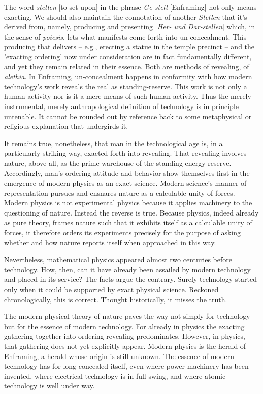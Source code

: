 \documentclass[12pt]{article}
\begin{document}
The word \textit{stellen} [to set upon] in the phrase \textit{Ge-stell} [Enframing] not only means exacting. We should also maintain the connotation of another \textit{Stellen} that it's derived from, namely, producing and presenting [\textit{Her- und Dar-stellen}] which, in the sense of \textit{poi{\-e}sis}, lets what manifests come forth into un-concealment. This producing that delivers -- e.g., erecting a statue in the temple precinct -- and the 'exacting ordering' now under consideration are in fact fundamentally different, and yet they remain related in their essence. Both are methods of revealing, of \textit{al{\-e}thia}. In Enframing, un-concealment happens in conformity with how modern technology's work reveals the real as standing-reserve. This work is not only a human activity nor is it a mere means of such human activity. Thus the merely instrumental, merely anthropological definition of technology is in principle untenable. It cannot be rounded out by reference back to some metaphysical or religious explanation that undergirds it.

It remains true, nonetheless, that man in the technological age is, in a particularly striking way, exacted forth into revealing. That revealing involves nature, above all, as the prime warehouse of the standing energy reserve. Accordingly, man's ordering attitude and behavior show themselves first in the emergence of modern physics as an exact science. Modern science's manner of representation pursues and ensnares nature as a calculable unity of forces. Modern physics is not experimental physics because it applies machinery to the questioning of nature. Instead the reverse is true. Because physics, indeed already as pure theory, frames nature such that it exhibits itself as a calculable unity of forces, it therefore orders its experiments precisely for the purpose of asking whether and how nature reports itself when approached in this way.

Nevertheless, mathematical physics appeared almost two centuries before technology. How, then, can it have already been assailed by modern technology and placed in its service? The facts argue the contrary. Surely technology started only when it could be supported by exact physical science. Reckoned chronologically, this is correct. Thought historically, it misses the truth.

The modern physical theory of nature paves the way not simply for technology but for the essence of modern technology. For already in physics the exacting gathering-together into ordering revealing predominates. However, in physics, that gathering does not yet explicitly appear. Modern physics is the herald of Enframing, a herald whose origin is still unknown. The essence of modern technology has for long concealed itself, even where power machinery has been invented, where electrical technology is in full swing, and where atomic technology is well under way.
\end{document}
